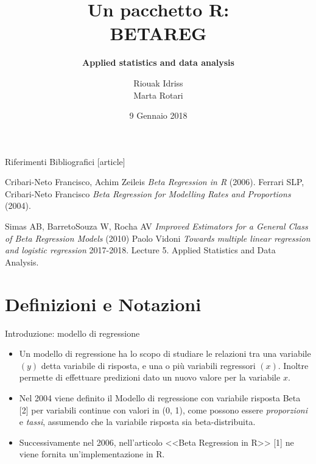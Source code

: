 \documentclass[usenames,dvipsnames]{beamer}
\title[Un pacchetto R: betareg] %
{ %
      \textbf{Un pacchetto R:\\ BETAREG}
}
\subtitle[ | BETAREG]
{
      \textbf{Applied statistics and data analysis}
}
\author[Riouak Idriss, Marta Rotari]
{      Riouak Idriss\\Marta Rotari
}
\institute[]
{
      
    Università degli studi di Udine\\
    Dipartimento di Matematica e Informatica \\
    Laurea specialistica in Informatica\\
  
 
}
\date{9 Gennaio 2018}
\begin{document}

{\1
\begin{frame} 
  \titlepage 
\end{frame}}

\begin{frame}{Riferimenti Bibliografici}
[article]
\begin{thebibliography}{99}
	 Cribari-Neto Francisco, Achim Zeileis \textit{Beta Regression in R} (2006).
 Ferrari SLP, Cribari-Neto Francisco \textit{Beta Regression for Modelling Rates and Proportions} (2004). 

 Simas AB, BarretoSouza W, Rocha AV \textit{Improved Estimators for a General Class of Beta Regression Models} (2010) 
 Paolo Vidoni \textit{Towards multiple linear regression and logistic regression}  2017-2018. Lecture 5. Applied Statistics and Data Analysis.
\end{thebibliography}
\end{frame}
\section{Definizioni e Notazioni}
\begin{frame}[fragile]{Introduzione: modello di regressione}
\begin{itemize}[<+->]
	\item[] Un modello di regressione ha lo scopo di studiare le relazioni tra una variabile $(y)$ detta variabile di \alert{risposta}, e una o più variabili  \alert{regressori} $(x)$. Inoltre permette di effettuare predizioni dato un nuovo valore per la variabile $x$.
	
	\item[]	Nel 2004  viene definito il \alert{Modello di regressione con variabile risposta Beta} [2] per variabili continue con valori in (0, 1), come possono essere \emph{proporzioni} e \emph{ tassi}, assumendo che la variabile risposta sia beta-distribuita. \item[] Successivamente nel 2006, nell'articolo <<Beta Regression in R>> [1] ne viene fornita un'implementazione in R.
\end{itemize}


\end{frame}
\end{document}
